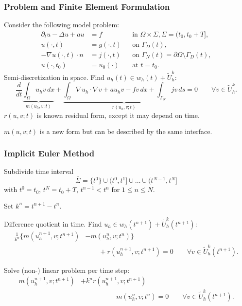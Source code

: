 \begin{frame}
\frametitle{Problem and Finite Element Formulation}
Consider the following model problem:
\begin{subequations} \label{Eq:Example03}
\begin{align*}
\partial_t u -\Delta u + a u &= f &&\text{in $\Omega\times\Sigma$}, \Sigma=(t_0,t_0+T],\\
u(\cdot,t) &= g(\cdot,t) && \text{on $\Gamma_D(t)$},\\ 
-\nabla u(\cdot,t) \cdot n &= j(\cdot,t) &&\text{on $\Gamma_N(t)=\partial\Omega\setminus\Gamma_D(t)$},\\
u(\cdot,t_0) &= u_0(\cdot) && \text{at $t=t_0$}.
\end{align*}
\end{subequations}
Semi-discretization in space. Find $u_h(t)\in w_h(t) + \tilde{U}_h^k$:
\begin{equation*}
\frac{d}{dt} \underbrace{\int_\Omega u_h v \,dx}_{m(u_h,v;t)} + \underbrace{\int_\Omega \nabla u_h \cdot \nabla v
+ a u_h v - f v \, dx + \int_{\Gamma_N} jv \, ds}_{r(u_h,v;t)} = 0 \qquad \forall v \in \tilde{U}_h^k.
\end{equation*}
$r(u,v;t)$ is known residual form, except it may depend on time.

$m(u,v;t)$ is a new form but can be described by the same interface.
\end{frame}

\begin{frame}
\frametitle{Implicit Euler Method}
Subdivide time interval
\begin{equation*}
\overline{\Sigma} = \{t^{0}\} \cup (t^0,t^1] \cup \ldots \cup (t^{N-1},t^N]
\end{equation*}
with $t^0=t_0$, $t^N=t_0+T$, $t^{n-1}<t^n$ for $1\leq n\leq N$.

Set $k^n=t^{n+1}-t^n$.

Difference quotient in time. Find $u_h \in w_h(t^{n+1}) + \tilde{U}_h^k(t^{n+1})$:
\begin{equation*}
\begin{split}
\frac{1}{k^n} \bigl\{ m\left(u_h^{n+1},v;t^{n+1}\right) &- m\left(u_h^{n},v;t^{n}\right)\bigr\} \\
&\qquad + r\left(u_h^{n+1},v;t^{n+1}\right) = 0
\qquad  \forall v \in \tilde{U}_h^k(t^{n+1}).
\end{split}
\end{equation*}

Solve (non-) linear problem per time step:
\begin{equation*}
\begin{split}
m\left(u_h^{n+1},v;t^{n+1}\right) &+ k^n r\left(u_h^{n+1},v;t^{n+1}\right)\\
&\qquad \qquad - m\left(u_h^{n},v;t^{n}\right) = 0 \qquad  \forall v \in \tilde{U}_h^k(t^{n+1}).
\end{split}
\end{equation*}
\end{frame}


